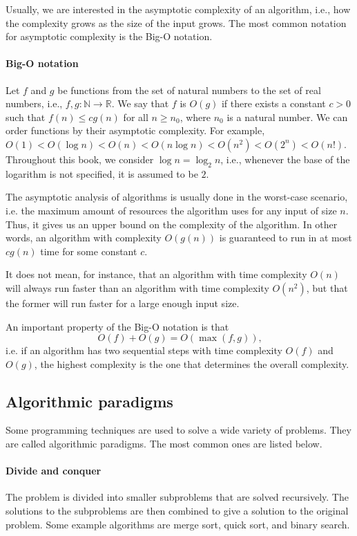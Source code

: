 Usually, we are interested in the asymptotic complexity of an algorithm, i.e., how
the complexity grows as the size of the input grows.  The most common notation for
asymptotic complexity is the Big-O notation.

\paragraph{Big-O notation}  Let $f$ and $g$ be functions from the set of natural numbers
to the set of real numbers, i.e., $f, g : \mathbb{N} \rightarrow \mathbb{R}$.  We say that $f$ is
$O(g)$ if there exists a constant $c > 0$ such that $f(n) \leq c g(n)$ for all $n \geq
n_0$, where $n_0$ is a natural number.
We can order functions by their asymptotic complexity.  For example, $O(1) < O(\log n) <
O(n) < O(n \log n) < O(n^2) < O(2^n) < O(n!)$.  Throughout this book, we consider
$\log n = \log_2 n$, i.e., whenever the base of the logarithm is not specified, it is
assumed to be $2$.

The asymptotic analysis of algorithms is usually done in the worst-case scenario, i.e.
the maximum amount of resources the algorithm uses for any input of size $n$.  Thus,
it gives us an upper bound on the complexity of the algorithm.  In other words, an
algorithm with complexity $O(g(n))$ is guaranteed to run in at most $c g(n)$ time for some
constant $c$.

It does not mean, for instance, that an algorithm with time complexity $O(n)$ will always run
faster than an algorithm with time complexity $O(n^2)$, but that the former will run faster
for a large enough input size.

An important property of the Big-O notation is that
\[
  O(f) + O(g) = O(\max(f, g))\text{,}
\]
i.e. if an algorithm has two sequential steps with time complexity $O(f)$ and $O(g)$, the
highest complexity is the one that determines the overall complexity.

\subsection{Algorithmic paradigms}

Some programming techniques are used to solve a wide variety of problems.  They are called
algorithmic paradigms.  The most common ones are listed below.

\paragraph{Divide and conquer}  The problem is divided into smaller subproblems that are
solved recursively.  The solutions to the subproblems are then combined to give a solution
to the original problem.  Some example algorithms are merge sort, quick sort, and binary
search.


